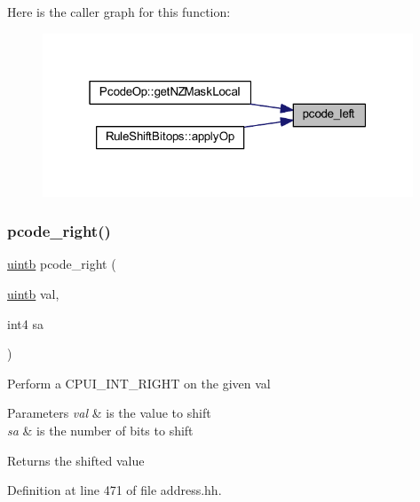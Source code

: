 Here is the caller graph for this function\+:
\nopagebreak
\begin{figure}[H]
\begin{center}
\leavevmode
\includegraphics[width=313pt]{address_8hh_af93e26c16ad497e986e09aedde194a93_icgraph}
\end{center}
\end{figure}
\mbox{\label{address_8hh_ac12878da77772a55518155dd325ede11}} 
\subsubsection{\texorpdfstring{pcode\_right()}{pcode\_right()}}
{\footnotesize\ttfamily \mbox{\hyperlink{types_8h_a2db313c5d32a12b01d26ac9b3bca178f}{uintb}} pcode\+\_\+right (\begin{DoxyParamCaption}\item[{\mbox{\hyperlink{types_8h_a2db313c5d32a12b01d26ac9b3bca178f}{uintb}}}]{val,  }\item[{int4}]{sa }\end{DoxyParamCaption})\hspace{0.3cm}{\ttfamily [inline]}}

Perform a C\+P\+U\+I\+\_\+\+I\+N\+T\+\_\+\+R\+I\+G\+HT on the given val 
\begin{DoxyParams}{Parameters}
{\em val} & is the value to shift \\
\hline
{\em sa} & is the number of bits to shift \\
\hline
\end{DoxyParams}
\begin{DoxyReturn}{Returns}
the shifted value 
\end{DoxyReturn}


Definition at line 471 of file address.\+hh.

